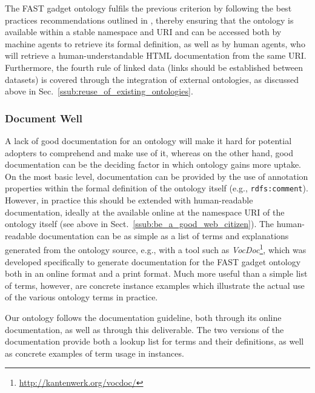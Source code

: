 \documentclass[twoside]{fast_latex}
\begin{document}
The FAST gadget ontology fulfils the previous criterion by following the best practices recommendations outlined in \cite{berrueta2008publishing_rdf_vocabularies}, thereby ensuring that the ontology is available within a stable namespace and URI and can be accessed both by machine agents to retrieve its formal definition, as well as by human agents, who will retrieve a human-understandable HTML documentation from the same URI. Furthermore, the fourth rule of linked data (links should be established between datasets) is covered through the integration of external ontologies, as discussed above in Sec.~\ref{ssub:reuse_of_existing_ontologies}.


\subsubsection{Document Well} %
\label{ssub:be_well_documented}

A lack of good documentation for an ontology will make it hard for potential adopters to comprehend and make use of it, whereas on the other hand, good documentation can be the deciding factor in which ontology gains more uptake. On the most basic level, documentation can be provided by the use of annotation properties within the formal definition of the ontology itself (e.g., \texttt{rdfs:comment}). However, in practice this should be extended with human-readable documentation, ideally at the available online at the namespace URI of the ontology itself (see above in Sect.~\ref{ssub:be_a_good_web_citizen}). The human-readable documentation can be as simple as a list of terms and explanations generated from the ontology source, e.g., with a tool such as \emph{VocDoc}\footnote{\url{http://kantenwerk.org/vocdoc/}}, which was developed specifically to generate documentation for the FAST gadget ontology both in an online format and a print format. Much more useful than a simple list of terms, however, are concrete instance examples which illustrate the actual use of the various ontology terms in practice.

Our ontology follows the documentation guideline, both through its online documentation, as well as through this deliverable. The two versions of the documentation provide both a lookup list for terms and their definitions, as well as concrete examples of term usage in instances.

\end{document}
